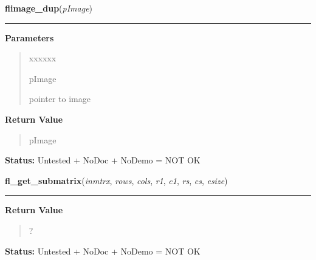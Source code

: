 \hspace{.8\funcindent}\begin{boxedminipage}{\funcwidth}

    \raggedright \textbf{flimage\_dup}(\textit{pImage})

    \vspace{-1.5ex}

    \rule{\textwidth}{0.5\fboxrule}
\setlength{\parskip}{2ex}
\setlength{\parskip}{1ex}
      \textbf{Parameters}
      \vspace{-1ex}

      \begin{quote}
        \begin{Ventry}{xxxxxx}

          \item[pImage]

          pointer to image

        \end{Ventry}

      \end{quote}

      \textbf{Return Value}
    \vspace{-1ex}

      \begin{quote}
      pImage

      \end{quote}

\textbf{Status:} Untested + NoDoc + NoDemo = NOT OK



    \end{boxedminipage}

    \label{xformslib:flflimage:fl_get_submatrix}

    \vspace{0.5ex}

\hspace{.8\funcindent}\begin{boxedminipage}{\funcwidth}

    \raggedright \textbf{fl\_get\_submatrix}(\textit{inmtrx}, \textit{rows}, \textit{cols}, \textit{r1}, \textit{c1}, \textit{rs}, \textit{cs}, \textit{esize})

    \vspace{-1.5ex}

    \rule{\textwidth}{0.5\fboxrule}
\setlength{\parskip}{2ex}
\setlength{\parskip}{1ex}
      \textbf{Return Value}
    \vspace{-1ex}

      \begin{quote}
      ?

      \end{quote}

\textbf{Status:} Untested + NoDoc + NoDemo = NOT OK



    \end{boxedminipage}

